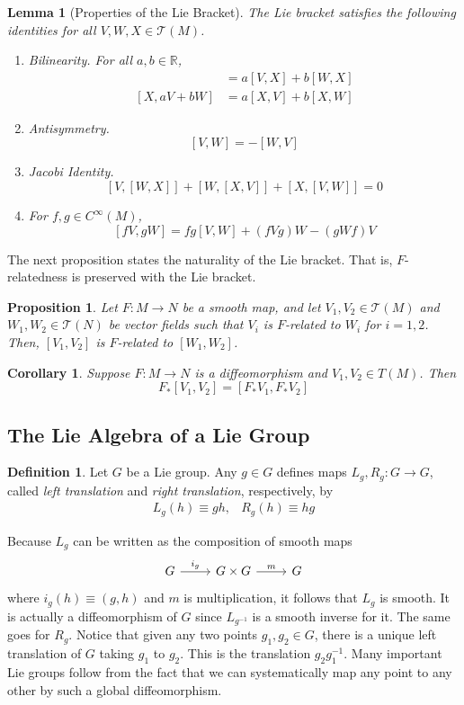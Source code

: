 \documentclass{article}
\newtheorem{proposition}[theorem]{Proposition}
\newtheorem{lemma}[theorem]{Lemma}
\newtheorem{corollary}{Corollary}[theorem]
\theoremstyle{remark}
\theoremstyle{definition}
\newtheorem{definition}{Definition}[section]
\begin{document}
\begin{lemma}[Properties of the Lie Bracket]
The Lie bracket satisfies the following identities for all $V, W, X \in \mathcal{T}(M)$. 
\begin{enumerate}
    \item Bilinearity. For all $a, b \in \mathbb{R}$, 
    \begin{align*}
        [a V + b W, X] & = a [V, X] + b [W, X] \\
        [X, a V + b W] & = a [X, V] + b [X, W]
    \end{align*}
    \item Antisymmetry.
    \[[V, W] = - [W, V]\]
    \item Jacobi Identity. 
    \[[V,[W,X]] + [W,[X,V]] + [X,[V,W]] = 0\]
    \item For $f, g \in C^\infty (M)$, 
    \[[f V, g W] = f g [V, W] + ( fVg) W - (gWf) V\]
\end{enumerate}
\end{lemma}

The next proposition states the naturality of the Lie bracket. That is, $F$-relatedness is preserved with the Lie bracket. 
\begin{proposition}
Let $F: M \longrightarrow N$ be a smooth map, and let $V_1, V_2 \in \mathcal{T} (M)$ and $W_1, W_2 \in \mathcal{T}(N)$ be vector fields such that $V_i$ is $F$-related to $W_i$ for $i = 1, 2$. Then, $[V_1, V_2]$ is $F$-related to $[W_1, W_2]$. 
\end{proposition}

\begin{corollary}
Suppose $F: M \longrightarrow N$ is a diffeomorphism and $V_1, V_2 \in T(M)$. Then 
\[F_* [V_1, V_2] = [F_* V_1, F_* V_2]\]
\end{corollary}

\subsection{The Lie Algebra of a Lie Group}
\begin{definition}
Let $G$ be a Lie group. Any $g \in G$ defines maps $L_g, R_g : G \longrightarrow G$, called \textit{left translation} and \textit{right translation}, respectively, by 
\begin{align*}
    L_g (h) \equiv g h , & R_g (h) \equiv h g
\end{align*}
\end{definition}

Because $L_g$ can be written as the composition of smooth maps 
\[\begin{tikzcd}
G \arrow{r}{i_g} & G \times G \arrow{r}{m} & G
\end{tikzcd}
\]
where $i_g (h) \equiv (g, h)$ and $m$ is multiplication, it follows that $L_g$ is smooth. It is actually a diffeomorphism of $G$ since $L_{g^{-1}}$ is a smooth inverse for it. The same goes for $R_g$. Notice that given any two points $g_1, g_2 \in G$, there is a unique left translation of $G$ taking $g_1$ to $g_2$. This is the translation $g_2 g_1^{-1}$. Many important Lie groups follow from the fact that we can systematically map any point to any other by such a global diffeomorphism. 
\end{document}
